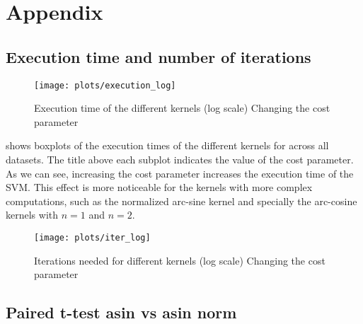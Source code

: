 \chapter{Appendix}

\section{Execution time and number of iterations}%
\label{sec:execution-time-and-number-of-iterations}


\begin{figure}[H]
    \texttt{[image: plots/execution\_log]}
    \caption{Execution time of the different kernels (log scale) Changing the cost
        parameter}%
    \label{fig:execution-log}
\end{figure}

 shows boxplots of the execution times of the different
kernels for across all datasets. The title above each subplot indicates the
value of the cost parameter. As we can see, increasing the cost parameter
increases the execution time of the SVM. This effect is more noticeable for the
kernels with more complex computations, such as the normalized arc-sine kernel
and specially the arc-cosine kernels with $n=1$ and $n=2$.

%

\begin{figure}[H]
    \texttt{[image: plots/iter\_log]}
    \caption{Iterations needed for different kernels (log scale) Changing the cost
        parameter}
\end{figure}


\section{Paired t-test asin vs asin norm}

